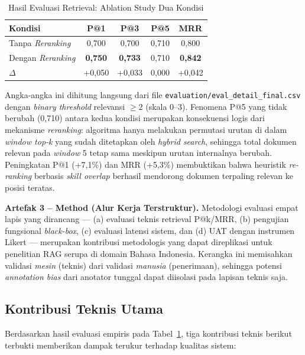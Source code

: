\begin{table}[H]
\centering
\caption{Hasil Evaluasi Retrieval: Ablation Study Dua Kondisi}
\label{tab:ablation_retrieval}
\begin{tabular}{lcccc}
\toprule
\textbf{Kondisi} & \textbf{P@1} & \textbf{P@3} & \textbf{P@5} & \textbf{MRR} \\
\midrule
Tanpa \textit{Reranking}  & 0{,}700 & 0{,}700 & 0{,}710 & 0{,}800 \\
Dengan \textit{Reranking} & \textbf{0{,}750} & \textbf{0{,}733} & 0{,}710 & \textbf{0{,}842} \\
\midrule
$\Delta$ & +0{,}050 & +0{,}033 & 0{,}000 & +0{,}042 \\
\bottomrule
\end{tabular}
\end{table}

Angka-angka ini dihitung langsung dari file \texttt{evaluation/eval\_detail\_final.csv} dengan \textit{binary threshold} relevansi $\geq 2$ (skala 0--3). Fenomena P@5 yang tidak berubah (0{,}710) antara kedua kondisi merupakan konsekuensi logis dari mekanisme \textit{reranking}: algoritma hanya melakukan permutasi urutan di dalam \textit{window top-k} yang sudah ditetapkan oleh \textit{hybrid search}, sehingga total dokumen relevan pada \textit{window} 5 tetap sama meskipun urutan internalnya berubah. Peningkatan P@1 (+7{,}1\%) dan MRR (+5{,}3\%) membuktikan bahwa heuristik \textit{re-ranking} berbasis \textit{skill overlap} berhasil mendorong dokumen terpaling relevan ke posisi teratas.

\textbf{Artefak 3 -- Method (Alur Kerja Terstruktur).}
Metodologi evaluasi empat lapis yang dirancang --- (a) evaluasi teknis retrieval P@k/MRR, (b) pengujian fungsional \textit{black-box}, (c) evaluasi latensi sistem, dan (d) UAT dengan instrumen Likert --- merupakan kontribusi metodologis yang dapat direplikasi untuk penelitian RAG serupa di domain Bahasa Indonesia. Kerangka ini memisahkan validasi \textit{mesin} (teknis) dari validasi \textit{manusia} (penerimaan), sehingga potensi \textit{annotation bias} dari anotator tunggal dapat diisolasi pada lapisan teknis saja.

\subsection{Kontribusi Teknis Utama}
Berdasarkan hasil evaluasi empiris pada Tabel~\ref{tab:ablation_retrieval}, tiga kontribusi teknis berikut terbukti memberikan dampak terukur terhadap kualitas sistem:


